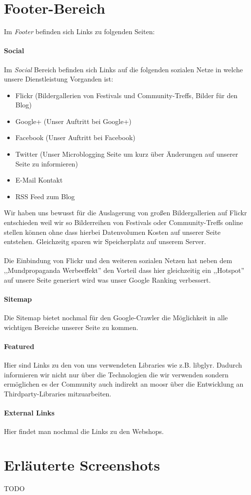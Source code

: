 \section{Footer-Bereich}
Im \emph{Footer} befinden sich Links zu folgenden Seiten:

\paragraph{Social}
Im \emph{Social} Bereich befinden sich Links auf die folgenden sozialen Netze in
welche unsere Dienstleistung Vorganden ist:
\begin{itemize}
\item Flickr (Bildergallerien von Festivals und Community-Treffs, Bilder für den
    Blog)
\item Google+ (Unser Auftritt bei Google+)
\item Facebook (Unser Auftritt bei Facebook)
\item Twitter (Unser Microblogging Seite um kurz über Änderungen auf unserer
Seite zu informieren)
\item E-Mail Kontakt
\item RSS Feed zum Blog
\end{itemize}

Wir haben uns bewusst für die Auslagerung von großen Bildergallerien auf Flickr
entschieden weil wir so Bilderreihen von Festivals oder Community-Treffs online
stellen können ohne dass hierbei Datenvolumen Kosten auf unserer Seite
entstehen. Gleichzeitg sparen wir Speicherplatz auf unserem Server.
\\
\\
Die Einbindung von Flickr und den weiteren sozialen Netzen hat neben dem
,,Mundpropaganda Werbeeffekt'' den Vorteil dass hier gleichzeitig ein
,,Hotspot'' auf unsere Seite generiert wird was unser Google Ranking verbessert.

\paragraph{Sitemap}
Die Sitemap bietet nochmal für den Google-Crawler die Möglichkeit in
alle wichtigen Bereiche unserer Seite zu kommen.
\paragraph{Featured}
Hier sind Links zu den von uns verwendeten Libraries wie z.B. libglyr. Dadurch
informieren wir nicht nur über die Technologien die wir verwenden sondern
ermöglichen es der Community auch indirekt an moosr über die Entwicklung an
Thirdparty-Libraries mitzuarbeiten.

\paragraph{External Links}
Hier findet man nochmal die Links zu den Webshops.

\section{Erläuterte Screenshots}
TODO
